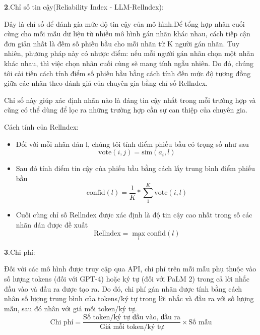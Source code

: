 \documentclass{article} %
\begin{document}
\textbf{2}.Chỉ số tin cậy(Reliability Index - LLM-Rellndex):

\noindent
Đây là chỉ số để đánh gía mức độ tin cậy của mô hình.Để tổng hợp nhãn cuối cùng cho mỗi mẫu dữ liệu từ nhiều mô hình gán nhãn khác nhau, 
cách tiếp cận đơn giản nhất là đếm số phiếu bầu cho mỗi nhãn từ K người gán nhãn. Tuy nhiên, phương pháp này có nhược điểm: 
nếu mỗi người gán nhãn chọn một nhãn khác nhau, thì việc chọn nhãn cuối cùng sẽ mang tính ngẫu nhiên.
Do đó, chúng tôi cải tiến cách tính điểm số phiếu bầu bằng cách tính đến mức độ tương đồng giữa các nhãn theo đánh giá của chuyên gia bằng chỉ số Rellndex.

Chỉ số này giúp xác định nhãn nào là đáng tin cậy nhất trong mỗi trường hợp và cũng có thể dùng để lọc ra những trường hợp cần sự can thiệp của chuyên gia.

Cách tính của Rellndex: 
\begin{itemize}
    \item Đối với mỗi nhãn dán l, chúng tôi tính điểm phiếu bầu có trọng số như sau \\
$$ \text{vote}(i, j) = \text{sim}(a_i, l) $$
    \item Sau đó tính điểm tin cậy của phiếu bầu bằng cách lấy trung bình điểm phiếu bầu\\
$$ \text{confid}(l) = \frac{1}{K} * \sum_{1}^{K}{\text{vote}(i, l)} $$
    \item Cuối cùng chỉ số Rellndex được xác định là độ tin cậy cao nhất trong số các nhãn dán được đề xuất\\
$$ \text{Rellndex} = \max_{l}{\text{confid}(l)} $$
\end{itemize}

\textbf{3}.Chi phí:

Đối với các mô hình được truy cập qua API, chi phí trên mỗi mẫu phụ thuộc vào số lượng tokens (đối với GPT-4) hoặc ký tự (đối với PaLM 2) 
trong cả lời nhắc đầu vào và đầu ra được tạo ra. Do đó, chi phí gán nhãn được tính bằng cách nhân số lượng trung bình của tokens/ký tự trong lời nhắc 
và đầu ra với số lượng mẫu, sau đó nhân với giá mỗi token/ký tự.
\[
\text{Chi phí} = \frac{\text{Số token/ký tự đầu vào, đầu ra}}{\text{Giá mỗi token/ký tự}} \times \text{Số mẫu}
\]
\end{document}
